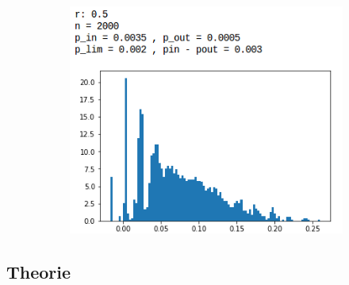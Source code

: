 \begin{figure}[H]
\begin{subfigure}{.5\textwidth}
		\label{bh1}
	\end{subfigure}
	\begin{subfigure}{.5\textwidth}
		\centering
		\includegraphics[scale=0.58]{static/bh_0_5.png}
		\label{bh05}
	\end{subfigure}
\end{figure}
\subsection{Theorie}